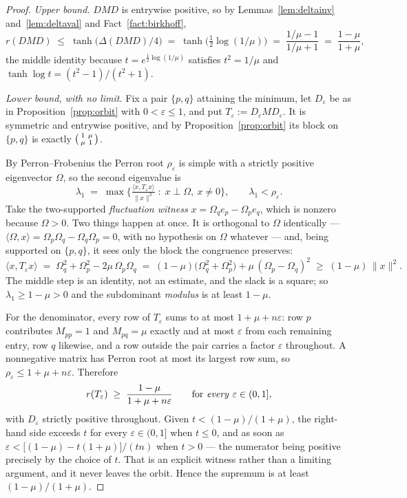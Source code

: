 \documentclass[11pt,a4paper]{article}
\theoremstyle{plain}
\theoremstyle{definition}
\begin{document}
\begin{proof}
\emph{Upper bound.} $DMD$ is entrywise positive, so by
Lemmas~\ref{lem:deltainv} and~\ref{lem:deltaval} and Fact~\ref{fact:birkhoff},
\[
  r(DMD)\;\le\;\tanh\!\big(\Delta(DMD)/4\big)
        \;=\;\tanh\!\big(\tfrac12\log(1/\mu)\big)
        \;=\;\frac{1/\mu-1}{1/\mu+1}\;=\;\frac{1-\mu}{1+\mu},
\]
the middle identity because $t=e^{\frac12\log(1/\mu)}$ satisfies $t^2=1/\mu$ and
$\tanh\log t=(t^2-1)/(t^2+1)$.

\emph{Lower bound, with no limit.} Fix a pair $\{p,q\}$ attaining the minimum,
let $D_\varepsilon$ be as in Proposition~\ref{prop:orbit} with
$0<\varepsilon\le1$, and put $T_\varepsilon := D_\varepsilon M D_\varepsilon$.
It is symmetric and entrywise positive, and by Proposition~\ref{prop:orbit} its
block on $\{p,q\}$ is exactly
$\begin{psmallmatrix}1&\mu\\ \mu&1\end{psmallmatrix}$.

By Perron--Frobenius the Perron root $\rho_\varepsilon$ is simple with a
strictly positive eigenvector $\Omega$, so the second eigenvalue is
\[
  \lambda_1 \;=\; \max\Big\{\tfrac{\langle x,T_\varepsilon x\rangle}{\|x\|^2}
    \;:\; x\perp\Omega,\ x\neq0 \Big\},
  \qquad \lambda_1 < \rho_\varepsilon .
\]
Take the two-supported \emph{fluctuation witness}
$x=\Omega_q e_p-\Omega_p e_q$, which is nonzero because $\Omega>0$. Two things
happen at once. It is orthogonal to $\Omega$ identically ---
$\langle\Omega,x\rangle=\Omega_p\Omega_q-\Omega_q\Omega_p=0$, with no
hypothesis on $\Omega$ whatever --- and, being supported on $\{p,q\}$, it sees
only the block the congruence preserves:
\[
  \langle x,T_\varepsilon x\rangle
   \;=\; \Omega_q^2+\Omega_p^2-2\mu\,\Omega_p\Omega_q
   \;=\; (1-\mu)\big(\Omega_q^2+\Omega_p^2\big)+\mu\,(\Omega_p-\Omega_q)^2
   \;\ge\; (1-\mu)\,\|x\|^2 .
\]
The middle step is an identity, not an estimate, and the slack is a square; so
$\lambda_1\ge 1-\mu>0$ and the subdominant \emph{modulus} is at least $1-\mu$.

For the denominator, every row of $T_\varepsilon$ sums to at most
$1+\mu+n\varepsilon$: row $p$ contributes $M_{pp}=1$ and $M_{pq}=\mu$ exactly and
at most $\varepsilon$ from each remaining entry, row $q$ likewise, and a row
outside the pair carries a factor $\varepsilon$ throughout. A nonnegative matrix
has Perron root at most its largest row sum, so
$\rho_\varepsilon\le 1+\mu+n\varepsilon$. Therefore
\[
  r(T_\varepsilon)\;\ge\;\frac{1-\mu}{1+\mu+n\varepsilon}
  \qquad\text{for \emph{every} }\varepsilon\in(0,1],
\]
with $D_\varepsilon$ strictly positive throughout. Given $t<(1-\mu)/(1+\mu)$,
the right-hand side exceeds $t$ for every $\varepsilon\in(0,1]$ when $t\le0$, and
as soon as $\varepsilon<\big[(1-\mu)-t(1+\mu)\big]/(tn)$ when $t>0$ --- the
numerator being positive precisely by the choice of $t$. That is an explicit
witness rather than a limiting argument, and it never leaves the orbit. Hence
the supremum is at least $(1-\mu)/(1+\mu)$.
\end{proof}
\end{document}
